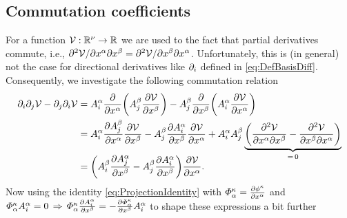 \subsection{Commutation coefficients}\label{sec:CommutationCoeff}
For a function $\potentialEnergy : \RealNum^{\numCoord} \rightarrow \RealNum$ we are used to the fact that partial derivatives commute, i.e., $\sfrac{\partial^2 \potentialEnergy}{\partial \sysCoordCoeff{\GidxI} \partial \sysCoordCoeff{\GidxII}} = \sfrac{\partial^2 \potentialEnergy}{\partial \sysCoordCoeff{\GidxII} \partial \sysCoordCoeff{\GidxI}}$.
Unfortunately, this is (in general) not the case for directional derivatives like $\dirDiff{\LidxI}$ defined in \eqref{eq:DefBasisDiff}.
Consequently, we investigate the following commutation relation
\allowdisplaybreaks
\begin{align}\label{eq:DerivationCommCoeff1}
 \dirDiff{\LidxI} \dirDiff{\LidxII} \potentialEnergy - \dirDiff{\LidxII} \dirDiff{\LidxI} \potentialEnergy 
 &= \kinMatCoeff{\GidxI}{\LidxI} \pdiff{\sysCoordCoeff{\GidxI}} \bigg( \kinMatCoeff{\GidxII}{\LidxII} \pdiff[\potentialEnergy]{\sysCoordCoeff{\GidxII}}\bigg) - \kinMatCoeff{\GidxII}{\LidxII} \pdiff{\sysCoordCoeff{\GidxII}} \bigg(\kinMatCoeff{\GidxI}{\LidxI} \pdiff[\potentialEnergy ]{\sysCoordCoeff{\GidxI}} \bigg)
\nonumber\\
 &= \kinMatCoeff{\GidxI}{\LidxI} \pdiff[\kinMatCoeff{\GidxII}{\LidxII}]{\sysCoordCoeff{\GidxI}} \pdiff[\potentialEnergy]{\sysCoordCoeff{\GidxII}} - \kinMatCoeff{\GidxII}{\LidxII} \pdiff[\kinMatCoeff{\GidxI}{\LidxI}]{\sysCoordCoeff{\GidxII}} \pdiff[\potentialEnergy ]{\sysCoordCoeff{\GidxI}}
 + \kinMatCoeff{\GidxI}{\LidxI} \kinMatCoeff{\GidxII}{\LidxII} \underbrace{\bigg( \frac{\partial^2 \potentialEnergy}{\partial\sysCoordCoeff{\GidxI} \partial\sysCoordCoeff{\GidxII}} - \frac{\partial^2 \potentialEnergy}{\partial\sysCoordCoeff{\GidxII} \partial\sysCoordCoeff{\GidxI}}\bigg)}_{=\,0}
\nonumber\\[-2ex]
 &= \bigg(\kinMatCoeff{\GidxII}{\LidxI} \pdiff[\kinMatCoeff{\GidxI}{\LidxII}]{\sysCoordCoeff{\GidxII}} - \kinMatCoeff{\GidxII}{\LidxII} \pdiff[\kinMatCoeff{\GidxI}{\LidxI}]{\sysCoordCoeff{\GidxII}}\bigg) \pdiff[\potentialEnergy]{\sysCoordCoeff{\GidxI}}
 .
\end{align}
Now using the identity \eqref{eq:ProjectionIdentity} with $\geoConstraintMatCoeff{\CidxI}{\GidxI} = \pdiff[\geoConstraintCoeff{\CidxI}]{\sysCoordCoeff{\GidxI}}$ and $\geoConstraintMatCoeff{\CidxI}{\GidxI} \kinMatCoeff{\GidxI}{\LidxI} = 0 \, \Rightarrow \, \geoConstraintMatCoeff{\CidxI}{\GidxI} \pdiff[\kinMatCoeff{\GidxI}{\LidxI}]{\sysCoordCoeff{\GidxII}} = -\pdiff[\geoConstraintMatCoeff{\CidxI}{\GidxI}]{\sysCoordCoeff{\GidxII}} \kinMatCoeff{\GidxI}{\LidxI}$ to shape these expressions a bit further
